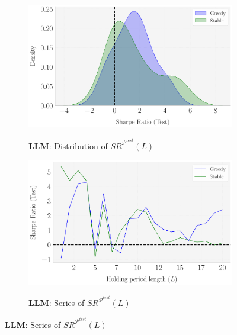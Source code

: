 \begin{figure}[H]
  \bx 
      \begin{subfigure}[b]{0.44\textwidth}
    \centering
    \caption{\textbf{LLM}: Distribution of $SR^{\mathcal P^{test}}(L)$}
    \includegraphics[width=\textwidth]{fig_9c_LLAMA_Distr_L(SR-Test).pdf}
    \label{fig:LLM_Robustness_L_Distr}
  \end{subfigure}
  \hspace{0.05\textwidth} %
  \begin{subfigure}[b]{0.44\textwidth}
    \centering
    \caption{\textbf{LLM}: Series of $SR^{\mathcal P^{test}}(L)$}
    \includegraphics[width=\textwidth]{fig_9d_LLAMA_SR-Test_vs_L.pdf}
    \label{fig:LLM_Robustness_L_Series}
  \end{subfigure}
\label{fig:LLM_Robustness_L}
\mx 

\end{figure}
